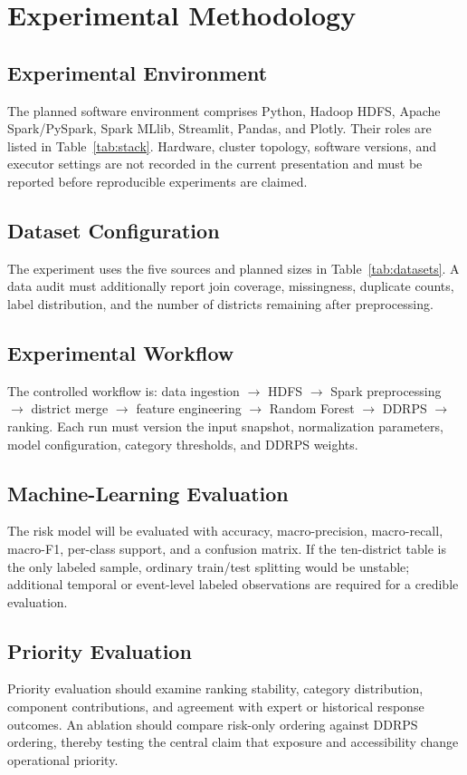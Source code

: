 \documentclass[conference]{IEEEtran}
\begin{document}
\section{Experimental Methodology}

\subsection{Experimental Environment}
The planned software environment comprises Python, Hadoop HDFS, Apache
Spark/PySpark, Spark MLlib, Streamlit, Pandas, and Plotly. Their roles are listed
in Table~\ref{tab:stack}. Hardware, cluster topology, software versions, and
executor settings are not recorded in the current presentation and must be
reported before reproducible experiments are claimed.

\subsection{Dataset Configuration}
The experiment uses the five sources and planned sizes in
Table~\ref{tab:datasets}. A data audit must additionally report join coverage,
missingness, duplicate counts, label distribution, and the number of districts
remaining after preprocessing.

\subsection{Experimental Workflow}
The controlled workflow is: data ingestion $\rightarrow$ HDFS $\rightarrow$
Spark preprocessing $\rightarrow$ district merge $\rightarrow$ feature
engineering $\rightarrow$ Random Forest $\rightarrow$ DDRPS $\rightarrow$
ranking. Each run must version the input snapshot, normalization parameters,
model configuration, category thresholds, and DDRPS weights.

\subsection{Machine-Learning Evaluation}
The risk model will be evaluated with accuracy, macro-precision, macro-recall,
macro-F1, per-class support, and a confusion matrix. If the ten-district table
is the only labeled sample, ordinary train/test splitting would be unstable;
additional temporal or event-level labeled observations are required for a
credible evaluation.

\subsection{Priority Evaluation}
Priority evaluation should examine ranking stability, category distribution,
component contributions, and agreement with expert or historical response
outcomes. An ablation should compare risk-only ordering against DDRPS ordering,
thereby testing the central claim that exposure and accessibility change
operational priority.
\end{document}
